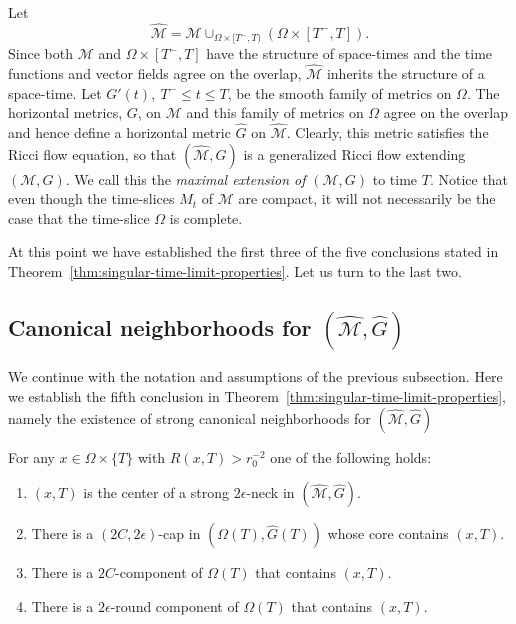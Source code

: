 \begin{definition}
\label{def:maximal-extension-to-time-T}
\label{hatM}
Let
$$\widehat {\mathcal M}= {\mathcal
M}\cup_{\Omega\times[T^-,T)} \left(\Omega\times
[T^-,T]\right).$$ Since both
${\mathcal M}$ and $\Omega\times [T^-,T]$ have the structure of
space-times and the time functions and vector fields agree on the
overlap, $\widehat {\mathcal M}$ inherits the structure of a
space-time. Let $G'(t),\ T^-\le t\le T$, be the smooth family of
metrics on $\Omega$. The horizontal metrics, $G$, on ${\mathcal M}$
and this family of metrics on $\Omega$ agree on the overlap and
hence define a horizontal metric $\widehat G$ on $\widehat {\mathcal
M}$. Clearly, this metric satisfies the Ricci flow equation, so that
$(\widehat {\mathcal M},\widehat G)$ is a generalized Ricci flow
extending $({\mathcal M},G)$. We call this the {\em maximal
extension of } $({\mathcal M},G)$ to time $T$. Notice that even
though the time-slices $M_t$ of ${\mathcal M}$ are compact, it will
not necessarily be the case that the time-slice $\Omega$ is
complete.
\end{definition}

At this point we have established the first three of the five
conclusions stated in Theorem~\ref{thm:singular-time-limit-properties}. Let us turn to the last
two.

\subsection{Canonical neighborhoods for $(\widehat{\mathcal M},\widehat G)$}

We continue with the notation and assumptions of the previous
subsection. Here we establish the fifth conclusion in
Theorem~\ref{thm:singular-time-limit-properties}, namely the existence of strong canonical
neighborhoods for
$(\widehat{\mathcal M},\widehat G)$


\begin{lemma}
\label{lem:canonical-neighborhoods-at-time-T}
\label{omegacanon}
For any $x\in \Omega\times\{T\}$ with $R(x,T)>r_0^{-2}$ one of the
following holds:
\begin{enumerate}
\item[(1)] $(x,T)$ is the center of a strong $2\epsilon$-neck in
$(\widehat{\mathcal M},\widehat G)$. \item[(2)] There is a
$(2C,2\epsilon)$-cap in $(\Omega(T),\widehat G(T))$ whose core
contains $(x,T)$. \item[(3)] There is a $2C$-component of
$\Omega(T)$ that contains $(x,T)$.
\item[(4)] There  is a $2\epsilon$-round component of $\Omega(T)$ that
contains $(x,T)$.
\end{enumerate}
\end{lemma}


